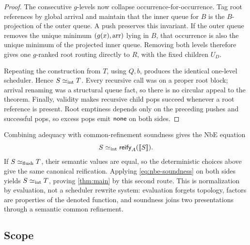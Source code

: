 \begin{proof}
The consecutive \(g\)-levels now collapse occurrence-for-occurrence.  Tag
root references by global arrival and maintain that the inner queue for \(B\)
is the \(B\)-projection of the outer queue.  A push preserves this invariant.
If the outer queue removes the unique minimum
\((g(x),\operatorname{arr})\) lying in \(B\), that occurrence is also the unique minimum of
the projected inner queue.  Removing both levels therefore gives one
\(g\)-ranked root routing directly to \(R\), with the fixed children \(U_D\).

Repeating the construction from \(T\), using \(Q,b\), produces the identical
one-level scheduler.  Hence \(S\mathrel{\simeq_{\mathrm{int}}} T\).  Every recursive call was on a
proper root block; arrival renaming was a structural queue fact, so there is
no circular appeal to the theorem.  Finally, validity makes recursive child
pops succeed whenever a root reference is present.  Root emptiness depends
only on the preceding pushes and successful pops, so excess pops emit
\(\mathsf{none}\) on both sides.
\end{proof}

Combining adequacy with common-refinement soundness gives the NbE equation
\begin{equation}
 S\mathrel{\simeq_{\mathrm{int}}}
 \mathsf{reify}_A(\mathopen{[\![}S\mathclose{]\!]}).
 \label{eq:nbe-soundness}
\end{equation}
If \(S\mathrel{\simeq_{\mathrm{flush}}} T\), their semantic values are equal, so the deterministic
choices above give the same canonical reification.  Applying
\autoref{eq:nbe-soundness} on both sides yields \(S\mathrel{\simeq_{\mathrm{int}}} T\), proving
\autoref{thm:main} by this second route.  This is normalization by evaluation,
not a scheduler rewrite system: evaluation forgets topology, factors are
properties of the denoted function, and soundness joins two presentations
through a semantic common refinement.

\subsection{Scope}

